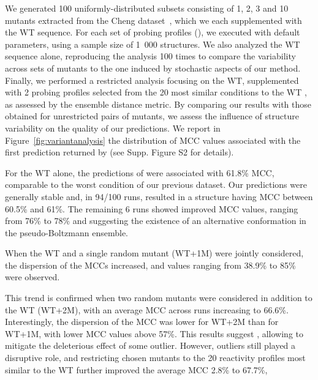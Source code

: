\documentclass[a4,center,fleqn]{NAR}
\begin{document}
We generated 100 uniformly-distributed subsets consisting of 1, 2, 3 and 10 mutants extracted from the Cheng dataset~\cite{Cheng2017}, which we each supplemented with the WT sequence.
For each set of probing profiles (), we executed \OurTool{} with default parameters, using a sample size of 1~000 structures. 
We also analyzed the WT sequence alone, reproducing the analysis 100 times to compare the variability across sets of mutants to the one induced by stochastic aspects of our method. 
Finally, we performed a restricted analysis focusing on the WT, supplemented with 2 probing profiles selected from the 20 most similar conditions to the WT , as assessed by the ensemble distance metric. By comparing our results with those obtained for unrestricted pairs of mutants, we assess the influence of structure variability on the quality of our predictions. We report in Figure~\ref{fig:variantanalysis} the distribution of MCC values associated with the first prediction returned by \OurTool (see Supp. Figure S2 for details).

For the WT alone, the predictions of \OurTool were associated with 61.8\% MCC, comparable to the worst condition of our previous dataset.
Our predictions were generally stable and, in 94/100 runs, resulted in a structure having MCC between 60.5\% and 61\%. The remaining 6 runs showed improved MCC values, ranging from 76\% to 78\% and suggesting the existence of an alternative conformation in the pseudo-Boltzmann ensemble.

When the WT and a single random mutant (WT+1M) were jointly considered, the dispersion of the MCCs increased, and values ranging from 38.9\% to 85\% were observed.%

This trend is confirmed when two random mutants were considered in addition to the WT (WT+2M), with an average MCC across runs increasing to 66.6\%. %
Interestingly, the dispersion of the MCC was lower for WT+2M than for WT+1M, with lower MCC values above 57\%.  This results suggest , allowing to mitigate the deleterious effect of some outlier.
However, outliers still played a disruptive role, and restricting chosen mutants to the 20 reactivity profiles most similar to the WT further improved the average MCC 2.8\% to 67.7\%,  
\end{document}
